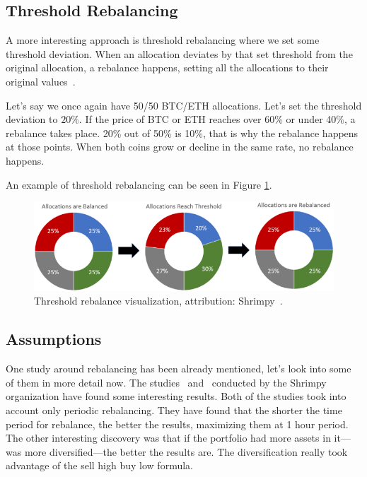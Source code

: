 \subsection*{Threshold Rebalancing}
A more interesting approach is threshold rebalancing where we set some threshold deviation. When an allocation deviates by that set threshold from the original allocation, a rebalance happens, setting all the allocations to their original values~\cite{portfolio-rebalancing}.

Let's say we once again have 50/50 BTC/ETH allocations. Let's set the threshold deviation to $20\%$. If the price of BTC or ETH reaches over 60\% or under 40\%, a rebalance takes place. 20\% out of 50\% is 10\%, that is why the rebalance happens at those points. When both coins grow or decline in the same rate, no rebalance happens.

An example of threshold rebalancing can be seen in Figure \ref{threshold-rebalance-figure}.

\begin{figure}[!hbt]
    \centering
    \includegraphics[width=\columnwidth]{figures/threshold-rebalance.png}
    \caption{Threshold rebalance visualization, attribution: Shrimpy~\cite{portfolio-rebalancing}.}
    \label{threshold-rebalance-figure}
\end{figure}

\subsection*{Assumptions}
\label{rebalance-assumptions}
One study around rebalancing has been already mentioned, let's look into some of them in more detail now. The studies~\cite{portfolio-diversity} and~\cite{diversify-perform-better} conducted by the Shrimpy organization have found some interesting results. Both of the studies took into account only periodic rebalancing. They have found that the shorter the time period for rebalance, the better the results, maximizing them at 1 hour period. The other interesting discovery was that if the portfolio had more assets in it---was more diversified---the better the results are. The diversification really took advantage of the sell high buy low formula.

